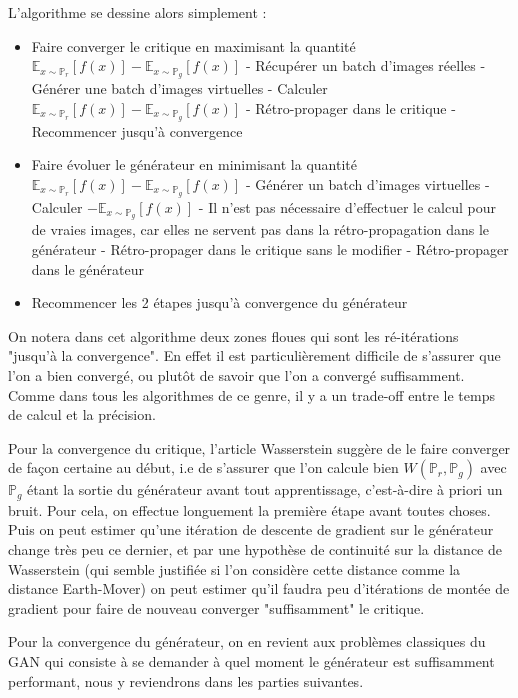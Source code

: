  L'algorithme se dessine alors simplement :
 \begin{itemize}
 \item Faire converger le critique en maximisant la quantité $\mathbb{E}_{x\sim\mathbb{P}_r}[f(x)] - \mathbb{E}_{x\sim\mathbb{P}_g}[f(x)] $
 \subitem - Récupérer un batch d'images réelles
 \subitem - Générer une batch d'images virtuelles
 \subitem - Calculer $\mathbb{E}_{x\sim\mathbb{P}_r}[f(x)] - \mathbb{E}_{x\sim\mathbb{P}_g}[f(x)] $
 \subitem - Rétro-propager dans le critique
 \subitem - Recommencer jusqu'à convergence
 \item Faire évoluer le générateur en minimisant la quantité $\mathbb{E}_{x\sim\mathbb{P}_r}[f(x)] - \mathbb{E}_{x\sim\mathbb{P}_g}[f(x)] $
 \subitem - Générer un batch d'images virtuelles
 \subitem - Calculer $- \mathbb{E}_{x\sim\mathbb{P}_g}[f(x)] $
 \subitem - Il n'est pas nécessaire d'effectuer le calcul pour de vraies images, car elles ne servent pas dans la rétro-propagation dans le générateur
 \subitem - Rétro-propager dans le critique sans le modifier
 \subitem - Rétro-propager dans le générateur
 \item Recommencer les 2 étapes jusqu'à convergence du générateur
 \end{itemize}

 On notera dans cet algorithme deux zones floues qui sont les ré-itérations "jusqu'à la convergence". En effet il est particulièrement difficile de s'assurer que l'on a bien convergé, ou plutôt de savoir que l'on a convergé suffisamment. Comme dans tous les algorithmes de ce genre, il y a un trade-off entre le temps de calcul et la précision.

 Pour la convergence du critique, l'article Wasserstein \cite{arjovsky_wasserstein_2017} suggère de le faire converger de façon certaine au début, i.e de s'assurer que l'on calcule bien $W ( \mathbb{P}_r, \mathbb{P}_g ) $ avec $\mathbb{P}_g$ étant la sortie du générateur avant tout apprentissage, c'est-à-dire à priori un bruit. Pour cela, on effectue longuement la première étape avant toutes choses. Puis on peut estimer qu'une itération de descente de gradient sur le générateur change très peu ce dernier, et par une hypothèse de continuité sur la distance de Wasserstein (qui semble justifiée si l'on considère cette distance comme la distance Earth-Mover) on peut estimer qu'il faudra peu d'itérations de montée de gradient pour faire de nouveau converger "suffisamment" le critique.

 Pour la convergence du générateur, on en revient aux problèmes classiques du GAN qui consiste à se demander à quel moment le générateur est suffisamment performant, nous y reviendrons dans les parties suivantes.

